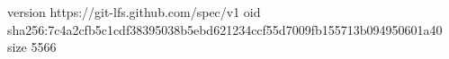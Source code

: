 version https://git-lfs.github.com/spec/v1
oid sha256:7c4a2cfb5c1cdf38395038b5ebd621234ccf55d7009fb155713b094950601a40
size 5566
